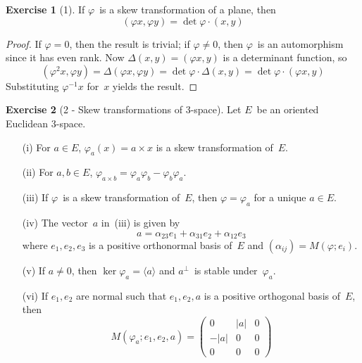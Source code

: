 \documentclass[letterpaper,12pt]{article}
\newcommand{\mult}{\cdot}
\newcommand{\cross}{\times}
\newcommand{\gen}[1]{\langle#1\rangle}
\newcommand{\oc}[1]{#1^{\perp}}
\newcommand{\iprod}[2]{(#1,#2)}
\newcommand{\norm}[1]{|#1|}
\theoremstyle{definition}
\newtheorem*{exer}{Exercise}
\theoremstyle{remark}
\begin{document}
\begin{exer}[1]
If \(\varphi\)~is a skew transformation of a plane, then
\[\iprod{\varphi x}{\varphi y}=\det\varphi\mult\iprod{x}{y}\]
\end{exer}
\begin{proof}
If \(\varphi=0\), then the result is trivial; if \(\varphi\ne 0\), then \(\varphi\)~is an automorphism since it has even rank. Now \(\Delta(x,y)=\iprod{\varphi x}{y}\) is a determinant function, so
\[\iprod{\varphi^2 x}{\varphi y}=\Delta(\varphi x,\varphi y)=\det\varphi\mult\Delta(x,y)=\det\varphi\mult\iprod{\varphi x}{y}\]
Substituting \(\varphi^{-1}x\) for~\(x\) yields the result.
\end{proof}

\begin{exer}[2 - Skew transformations of 3-space]
Let \(E\)~be an oriented Euclidean 3-space.
\begin{enumerate}
\item[(i)] For \(a\in E\), \(\varphi_a(x)=a\cross x\) is a skew transformation of~\(E\).
\item[(ii)] For \(a,b\in E\), \(\varphi_{a\cross b}=\varphi_a\varphi_b-\varphi_b\varphi_a\).
\item[(iii)] If \(\varphi\)~is a skew transformation of~\(E\), then \(\varphi=\varphi_a\) for a unique \(a\in E\).
\item[(iv)] The vector~\(a\) in~(iii) is given by
\[a=\alpha_{23}e_1+\alpha_{31}e_2+\alpha_{12}e_3\]
where \(e_1,e_2,e_3\) is a positive orthonormal basis of~\(E\) and \((\alpha_{ij})=M(\varphi;e_i)\).
\item[(v)] If \(a\ne 0\), then \(\ker\varphi_a=\gen{a}\) and \(\oc{a}\)~is stable under~\(\varphi_a\).
\item[(vi)] If \(e_1,e_2\) are normal such that \(e_1,e_2,a\) is a positive orthogonal basis of~\(E\), then
\[M(\varphi_a;e_1,e_2,a)=\begin{pmatrix}
0&\norm{a}&0\\
-\norm{a}&0&0\\
0&0&0
\end{pmatrix}\]
\end{enumerate}
\end{exer}
\end{document}
